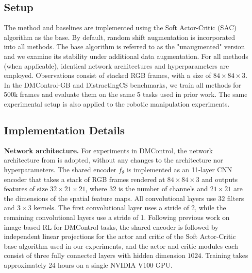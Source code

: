 \subsection{\textbf{Setup}}The method and baselines are implemented using the Soft Actor-Critic (SAC) algorithm as the base. By default, random shift augmentation is incorporated into all methods. The base algorithm is referred to as the "unaugmented" version and we examine its stability under additional data augmentation. For all methods (when applicable), identical network architectures and hyperparameters are employed. Observations consist of stacked RGB frames, with a size of $84\times84\times3$. In the DMControl-GB and DistractingCS benchmarks, we train all methods for 500k frames and evaluate them on the same 5 tasks used in prior work. The same experimental setup is also applied to the robotic manipulation experiments.


\subsection{\textbf{Implementation Details}}
\textbf{Network architecture.} For experiments in DMControl, the network architecture from \cite{hansen2021softda} is adopted, without any changes to the architecture nor hyperparameters. The shared encoder $f_{\theta}$ is implemented as an 11-layer CNN encoder that takes a stack of RGB frames rendered at $84\times84\times3$ and outputs features of size $32\times 21 \times 21$, where $32$ is the number of channels and $21\times21$ are the dimensions of the spatial feature maps. All convolutional layers use $32$ filters and $3\times3$ kernels. The first convolutional layer uses a stride of 2, while the remaining convolutional layers use a stride of 1. Following previous work on image-based RL for DMControl tasks, the shared encoder is followed by independent linear projections for the actor and critic of the Soft Actor-Critic base algorithm used in our experiments, and the actor and critic modules each consist of three fully connected layers with hidden dimension $1024$. Training takes approximately 24 hours on a single NVIDIA V100 GPU.
